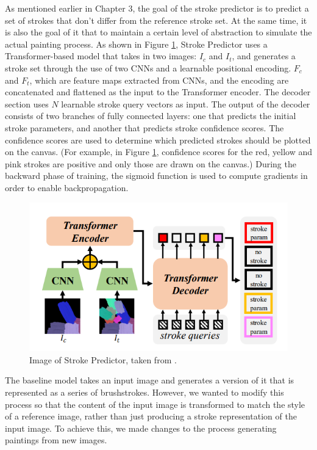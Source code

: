 As mentioned earlier in Chapter 3, the goal of the stroke predictor is to 
predict a set of strokes that don't differ from the reference stroke set. 
At the same time, it is also the goal of it that  to maintain a certain level
of abstraction to simulate the actual painting process.
As shown in Figure \ref{StrokePredictor}, Stroke Predictor uses a Transformer-based model 
that takes in two images: $I_c$ and $I_t$, and generates a stroke set through 
the use of two CNNs and a learnable positional encoding.
$F_c$ and  $F_t$, which are feature maps extracted from CNNs, and 
the encoding are concatenated and flattened as the input to the 
Transformer encoder. The decoder section uses $N$ learnable stroke 
query vectors as input. The output of the decoder consists of two 
branches of fully connected layers: one that predicts the initial 
stroke parameters, and another that predicts stroke confidence 
scores. The confidence scores are used to determine which predicted 
strokes should be plotted on the canvas. 
(For example, in Figure \ref{StrokePredictor}, confidence scores 
for the red, yellow and pink strokes are positive and only those 
are drawn on the canvas.)
During the backward phase of training, the sigmoid function is used 
to compute gradients in order to enable backpropagation.
\begin{figure}[h]
    \centering
    \includegraphics[width=110truemm]{resources/4_methods/StrokePredictor.png}
    \caption{
        Image of Stroke Predictor,
        taken from \cite{liu2021paint}.
    }
    \label{StrokePredictor}
\end{figure}

The baseline model takes an input image and generates a version of it that is 
represented as a series of brushstrokes.
However, we wanted to modify this process so that the content of 
the input image is transformed to match the style of a reference 
image, rather than just producing a stroke representation of the 
input image. To achieve this, we made changes to the process 
generating paintings from new images.

